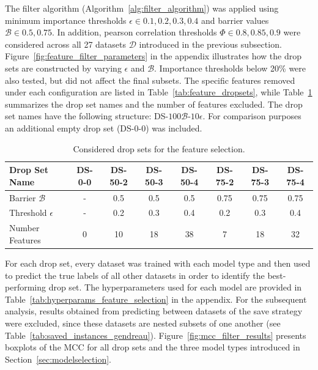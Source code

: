 The filter algorithm (Algorithm~\ref{alg:filter_algorithm}) was applied using minimum importance thresholds $\epsilon \in {0.1, 0.2, 0.3, 0.4}$
and barrier values $\mathcal{B} \in {0.5, 0.75}$. In addition, pearson correlation thresholds $\Phi \in {0.8, 0.85, 0.9}$ were considered
across all 27 datasets $\mathcal{D}$ introduced in the previous subsection. Figure~\ref{fig:feature_filter_parameters} in the appendix
illustrates how the drop sets are constructed by varying $\epsilon$ and $\mathcal{B}$. Importance thresholds below 20\% were also tested, but
did not affect the final subsets. The specific features removed under each configuration are listed in Table~\ref{tab:feature_dropsets},
while Table~\ref{tab:drop_set_presentation_shortened} summarizes the drop set names and the number of features excluded. The drop set
names have the following structure: DS-$100\mathcal{B}$-$10\epsilon$. For comparison purposes an additional empty drop set (DS-0-0) was included.

\begin{table}[ht]
	\centering
	\small
	\begin{tabular}{l c c c c c c c}
		\toprule
		Drop Set Name         & DS-0-0 & DS-50-2 & DS-50-3 & DS-50-4 & DS-75-2 & DS-75-3 & DS-75-4 \\
		\midrule
		Barrier $\mathcal{B}$ & -      & 0.5     & 0.5     & 0.5     & 0.75    & 0.75    & 0.75    \\
		Threshold $\epsilon$  & -      & 0.2     & 0.3     & 0.4     & 0.2     & 0.3     & 0.4     \\
		Number Features       & 0      & 10      & 18      & 38      & 7       & 18      & 32      \\
		\bottomrule
	\end{tabular}
	\caption{Considered drop sets for the feature selection.}
	\label{tab:drop_set_presentation_shortened}
\end{table}
For each drop set, every dataset was trained with each model type and then used to predict the
true labels of all other datasets in order to identify the best-performing drop set. The hyperparameters used for
each model are provided in Table~\ref{tab:hyperparams_feature_selection} in the appendix. For the subsequent analysis,
results obtained from predicting between datasets of the save strategy were excluded, since these datasets are nested
subsets of one another (see Table~\ref{tab:saved_instances_gendreau}). Figure~\ref{fig:mcc_filter_results} presents boxplots of
the \gls{MCC} for all drop sets and the three model types introduced in Section~\ref{sec:modelselection}.

